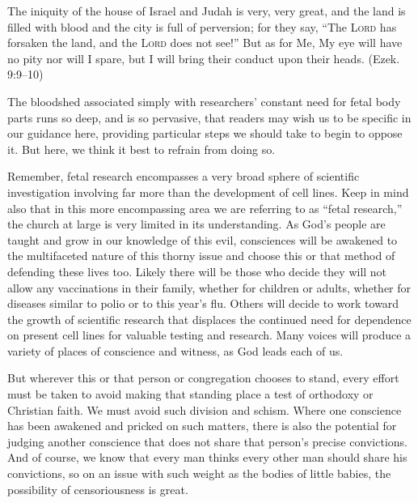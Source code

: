 \documentclass[
]{book}
\begin{document}
The iniquity of the house of Israel and Judah is very, very great, and the land is filled with blood and the city is full of perversion; for they say, ``The \textsc{Lord} has forsaken the land, and the \textsc{Lord} does not see!'' But as for Me, My eye will have no pity nor will I spare, but I will bring their conduct upon their heads. (Ezek. 9:9--10)

The bloodshed associated simply with researchers' constant need for fetal body parts runs so deep, and is so pervasive, that readers may wish us to be specific in our guidance here, providing particular steps we should take to begin to oppose it. But here, we think it best to refrain from doing so.

Remember, fetal research encompasses a very broad sphere of scientific investigation involving far more than the development of cell lines. Keep in mind also that in this more encompassing area we are referring to as ``fetal research,'' the church at large is very limited in its understanding. As God's people are taught and grow in our knowledge of this evil, consciences will be awakened to the multifaceted nature of this thorny issue and choose this or that method of defending these lives too. Likely there will be those who decide they will not allow any vaccinations in their family, whether for children or adults, whether for diseases similar to polio or to this year's flu. Others will decide to work toward the growth of scientific research that displaces the continued need for dependence on present cell lines for valuable testing and research. Many voices will produce a variety of places of conscience and witness, as God leads each of us.

But wherever this or that person or congregation chooses to stand, every effort must be taken to avoid making that standing place a test of orthodoxy or Christian faith. We must avoid such division and schism. Where one conscience has been awakened and pricked on such matters, there is also the potential for judging another conscience that does not share that person's precise convictions. And of course, we know that every man thinks every other man should share his convictions, so on an issue with such weight as the bodies of little babies, the possibility of censoriousness is great.
\end{document}
